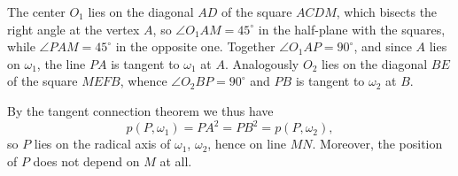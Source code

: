 {    The center $O_1$ lies on the diagonal $AD$ of the square $ACDM$, which bisects the right angle at the vertex $A$, so $\angle O_1AM = 45^\circ$ in the half-plane with the squares, while $\angle PAM = 45^\circ$ in the opposite one. Together $\angle O_1AP = 90^\circ$, and since $A$ lies on $\omega_1$, the line $PA$ is tangent to $\omega_1$ at $A$. Analogously $O_2$ lies on the diagonal $BE$ of the square $MEFB$, whence $\angle O_2BP = 90^\circ$ and $PB$ is tangent to $\omega_2$ at $B$.

    By the tangent connection theorem we thus have
    $$
    p(P,\omega_1) = PA^2 = PB^2 = p(P,\omega_2),
    $$
    so $P$ lies on the radical axis of $\omega_1$, $\omega_2$, hence on line $MN$. Moreover, the position of $P$ does not depend on $M$ at all.
}


